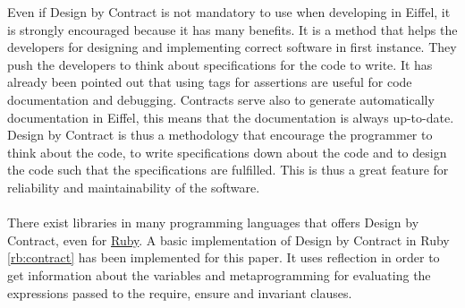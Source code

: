 \documentclass[12pt,a4paper,twocolumn]{article}
\begin{document}
Even if Design by Contract is not mandatory to use when developing in Eiffel, it is strongly encouraged because it has many benefits. It is a method that helps the developers for designing and implementing correct software in first instance. They push the developers to think about specifications for the code to write. It has already been pointed out that using tags for assertions are useful for code documentation and debugging. Contracts serve also to generate automatically documentation in Eiffel, this means that the documentation is always up-to-date. Design by Contract is thus a methodology that encourage the programmer to think about the code, to write specifications down about the code and to design the code such that the specifications are fulfilled. This is thus a great feature for reliability and maintainability of the software.
\\
\\
There exist libraries in many programming languages that offers Design by Contract, even for \href{https://github.com/egonSchiele/contracts.ruby}{Ruby}. A basic implementation of Design by Contract in Ruby \ref{rb:contract} has been implemented for this paper. It uses reflection in order to get information about the variables and metaprogramming for evaluating the expressions passed to the require, ensure and invariant clauses.
\end{document}
